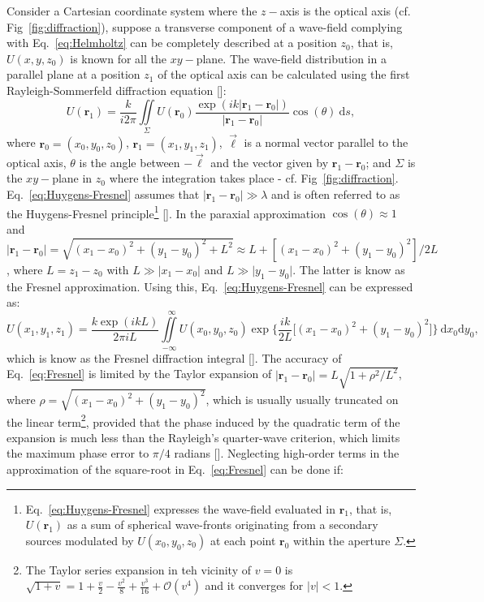 \begin{refsection}
Consider a Cartesian coordinate system where the $z-$axis is the optical axis (cf. Fig~\ref{fig:diffraction}), suppose a transverse component of a wave-field complying with Eq.~\ref{eq:Helmholtz} can be completely described at a position $z_0$, that is, $U(x,y,z_0)$ is known for all the $xy-$plane. The wave-field distribution in a parallel plane at a position $z_1$ of the optical axis can be calculated using the first Rayleigh-Sommerfeld diffraction equation [\cite[\textit{Eq.~3-42}]{Goodman2017}]:
\begin{equation}\label{eq:Huygens-Fresnel}
    U(\textbf{r}_1) = \frac{k}{i2\pi}\iint\limits_{\Sigma}{U(\textbf{r}_0)\frac{\exp{(ik\vert\textbf{r}_1 - \textbf{r}_0\vert)}}{\vert\textbf{r}_1 - \textbf{r}_0\vert}\cos{(\theta)}~\mathrm{d}s},
\end{equation}
where $\textbf{r}_0=(x_0,y_0,z_0)$, $\textbf{r}_1=(x_1,y_1,z_1)$, $\vec{\ell}$ is a normal vector parallel to the optical axis, $\theta$ is the angle between $-\vec{\ell}$ and the vector given by $\textbf{r}_1-\textbf{r}_0$; and $\Sigma$ is the $xy-$plane in $z_0$ where the integration takes place - cf. Fig~\ref{fig:diffraction}. Eq.~\ref{eq:Huygens-Fresnel} assumes that $\vert\textbf{r}_1 - \textbf{r}_0\vert\gg\lambda$ and is often referred to as the Huygens-Fresnel principle\footnote{Eq.~\ref{eq:Huygens-Fresnel} expresses the wave-field evaluated in $\textbf{r}_1$, that is, $U(\textbf{r}_1)$ as a sum of spherical wave-fronts originating from a secondary sources modulated by $U(x_0,y_0,z_0)$ at each point $\textbf{r}_0$ within the aperture $\Sigma$.} [\cite[\textit{§3.7}]{Goodman2017}]. In the paraxial approximation $\cos{(\theta)}\approx1$ and $\vert\textbf{r}_1 - \textbf{r}_0\vert=\sqrt{(x_1-x_0)^2+(y_1-y_0)^2+L^2}\approx L +[(x_1-x_0)^2+(y_1-y_0)^2]/2L$, where $L=z_1-z_0$ with $L\gg\vert x_1-x_0\vert$ and $L\gg\vert y_1-y_0\vert$. The latter is know as the Fresnel approximation. Using this, Eq.~\ref{eq:Huygens-Fresnel} can be expressed as:
\begin{equation}\label{eq:Fresnel}
    U(x_1,y_1,z_1)=\frac{k\exp{(ikL)}}{2\pi i L}\iint\limits_{-\infty}^{\hspace{8pt}\infty}{U(x_0,y_0,z_0)\exp{\Bigg\{\frac{ik}{2L}\big[(x_1-x_0)^2+(y_1-y_0)^2 \big]\Bigg\}}~\mathrm{d}x_0\mathrm{d}y_0},
\end{equation}
which is know as the Fresnel diffraction integral [\cite[\textit{§4.2}]{Goodman2017}]. The accuracy of Eq.~\ref{eq:Fresnel} is limited by the Taylor expansion of $\vert\textbf{r}_1 - \textbf{r}_0\vert=L\sqrt{1+\rho^2/L^2}$, where  $\rho = \sqrt{(x_1-x_0)^2+(y_1-y_0)^2}$, which is usually usually truncated on the linear term\footnote{The Taylor series expansion in teh vicinity of $v=0$ is $\sqrt{1+v}=1+\frac{v}{2}-\frac{v^2}{8}+\frac{v^3}{16}+\mathcal{O}(v^4)$ and it converges for $\vert v\vert<1$.}, provided that the phase induced by the quadratic term of the expansion is much less than the Rayleigh's quarter-wave criterion, which limits the maximum phase error to $\pi/4$ radians [\cite[\textit{§9.3}]{born_wolf1999}]. Neglecting high-order terms in the approximation of the square-root in Eq.~\ref{eq:Fresnel} can be done if:

\end{refsection}
